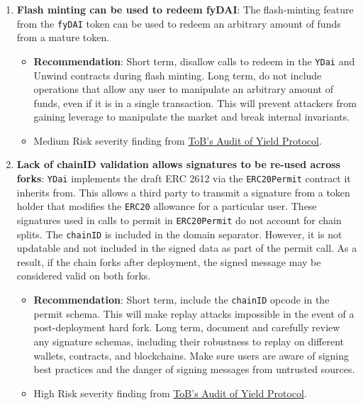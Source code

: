 \begin{enumerate}
\item\textbf{Flash minting can be used to redeem fyDAI}: The flash-minting feature from the \verb|fyDAI| token can be used to redeem an arbitrary amount of funds from a mature token.
	\begin{itemize}
	\item\textbf{Recommendation}: Short term, disallow calls to redeem in the \verb|YDai| and Unwind contracts during flash minting. Long term, do not include operations that allow any user to manipulate an arbitrary amount of funds, even if it is in a single transaction. This will prevent attackers from gaining leverage to manipulate the market and break internal invariants.
	\item Medium Risk severity finding from \href{https://github.com/trailofbits/publications/blob/master/reviews/YieldProtocol.pdf}{ToB’s Audit of Yield Protocol}.
	\end{itemize}

\item\textbf{Lack of chainID validation allows signatures to be re-used across forks}: \verb|YDai| implements the draft ERC 2612 via the \verb|ERC20Permit| contract it inherits from. This allows a third party to transmit a signature from a token holder that modifies the \verb|ERC20| allowance for a particular user. These signatures used in calls to permit in \verb|ERC20Permit| do not account for chain splits. The \verb|chainID| is included in the domain separator. However, it is not updatable and not included in the signed data as part of the permit call. As a result, if the chain forks after deployment, the signed message may be considered valid on both forks.
	\begin{itemize}
	\item\textbf{Recommendation}: Short term, include the \verb|chainID| opcode in the permit schema. This will make replay attacks impossible in the event of a post-deployment hard fork. Long term, document and carefully review any signature schemas, including their robustness to replay on different wallets, contracts, and blockchains. Make sure users are aware of signing best practices and the danger of signing messages from untrusted sources.
	\item High Risk severity finding from \href{https://github.com/trailofbits/publications/blob/master/reviews/YieldProtocol.pdf}{ToB’s Audit of Yield Protocol}.
	\end{itemize}


\end{enumerate}
